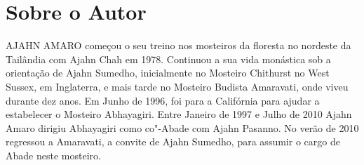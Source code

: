 \chapter{Sobre o Autor}

{\firaSansLightFont AJAHN AMARO} começou o seu treino nos mosteiros da floresta no nordeste
da Tailândia com Ajahn Chah em 1978. Continuou a sua vida monástica sob
a orientação de Ajahn Sumedho, inicialmente no Mosteiro Chithurst no
West Sussex, em Inglaterra, e mais tarde no Mosteiro Budista Amaravati,
onde viveu durante dez anos. Em Junho de 1996, foi para a Califórnia
para ajudar a estabelecer o Mosteiro Abhayagiri. Entre Janeiro de 1997 e
Julho de 2010 Ajahn Amaro dirigiu Abhayagiri como co"-Abade com Ajahn
Pasanno. No verão de 2010 regressou a Amaravati, a convite de Ajahn
Sumedho, para assumir o cargo de Abade neste mosteiro.
